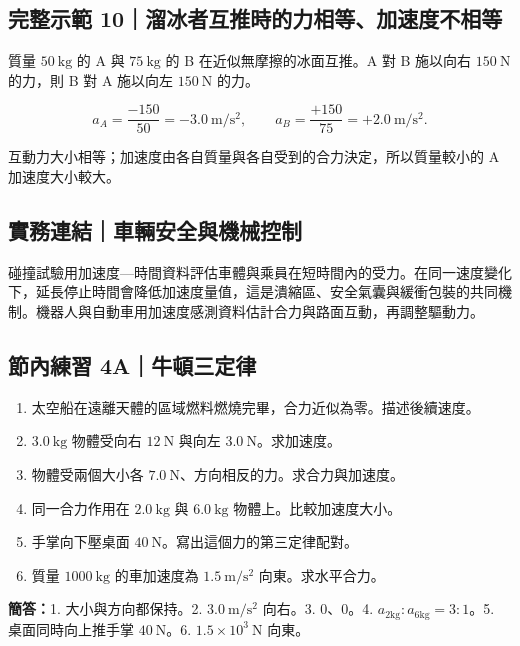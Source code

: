 \documentclass[11pt,a4paper]{article}
\providecommand{\tightlist}{%
  \setlength{\itemsep}{0pt}\setlength{\parskip}{0pt}}
\begin{document}
\begin{HandoutWorkedExample}

\subsection{完整示範 10｜溜冰者互推時的力相等、加速度不相等}\label{ux5b8cux6574ux793aux7bc4-10ux6e9cux51b0ux8005ux4e92ux63a8ux6642ux7684ux529bux76f8ux7b49ux52a0ux901fux5ea6ux4e0dux76f8ux7b49}

質量 \(50\ \mathrm{kg}\) 的 A 與 \(75\ \mathrm{kg}\) 的 B 在近似無摩擦的冰面互推。A 對 B 施以向右 \(150\ \mathrm N\) 的力，則 B 對 A 施以向左 \(150\ \mathrm N\) 的力。

\[
a_A=\frac{-150}{50}=-3.0\ \mathrm{m/s^2},
\qquad
a_B=\frac{+150}{75}=+2.0\ \mathrm{m/s^2}.
\]

互動力大小相等；加速度由各自質量與各自受到的合力決定，所以質量較小的 A 加速度大小較大。

\end{HandoutWorkedExample}

\subsection{實務連結｜車輛安全與機械控制}\label{ux5be6ux52d9ux9023ux7d50ux8ecaux8f1bux5b89ux5168ux8207ux6a5fux68b0ux63a7ux5236}

碰撞試驗用加速度---時間資料評估車體與乘員在短時間內的受力。在同一速度變化下，延長停止時間會降低加速度量值，這是潰縮區、安全氣囊與緩衝包裝的共同機制。機器人與自動車用加速度感測資料估計合力與路面互動，再調整驅動力。

\begin{HandoutSelfCheck}

\subsection{節內練習 4A｜牛頓三定律}\label{ux7bc0ux5167ux7df4ux7fd2-4aux725bux9813ux4e09ux5b9aux5f8b}

\begin{enumerate}
\def\labelenumi{\arabic{enumi}.}
\tightlist
\item
  太空船在遠離天體的區域燃料燃燒完畢，合力近似為零。描述後續速度。
\item
  \(3.0\ \mathrm{kg}\) 物體受向右 \(12\ \mathrm N\) 與向左 \(3.0\ \mathrm N\)。求加速度。
\item
  物體受兩個大小各 \(7.0\ \mathrm N\)、方向相反的力。求合力與加速度。
\item
  同一合力作用在 \(2.0\ \mathrm{kg}\) 與 \(6.0\ \mathrm{kg}\) 物體上。比較加速度大小。
\item
  手掌向下壓桌面 \(40\ \mathrm N\)。寫出這個力的第三定律配對。
\item
  質量 \(1000\ \mathrm{kg}\) 的車加速度為 \(1.5\ \mathrm{m/s^2}\) 向東。求水平合力。
\end{enumerate}

\textbf{簡答：}1. 大小與方向都保持。2. \(3.0\ \mathrm{m/s^2}\) 向右。3. \(0\)、\(0\)。4. \(a_{2\mathrm{kg}}:a_{6\mathrm{kg}}=3:1\)。5. 桌面同時向上推手掌 \(40\ \mathrm N\)。6. \(1.5\times10^3\ \mathrm N\) 向東。

\end{HandoutSelfCheck}
\end{document}
